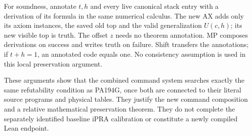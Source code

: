 For soundness, annotate $t,h$ and every live canonical stack entry with a
derivation of its formula in the same numerical calculus. The new AX adds
only its axiom instances, the saved old top and the valid generalization
$U(c,h)$; its new visible top is truth. The offset $z$ needs no theorem
annotation. MP composes derivations on success and writes truth on failure.
Shift transfers the annotations; if $t+h=1$, an annotated code equals one.
No consistency assumption is used in this local preservation argument.

These arguments show that the combined command system searches exactly
the same refutability condition as PA194G, once both are connected to their
literal source programs and physical tables. They justify the new command
composition and a relative mathematical preservation theorem. They do not
complete the separately identified baseline iPRA calibration or constitute
a newly compiled Lean endpoint.
